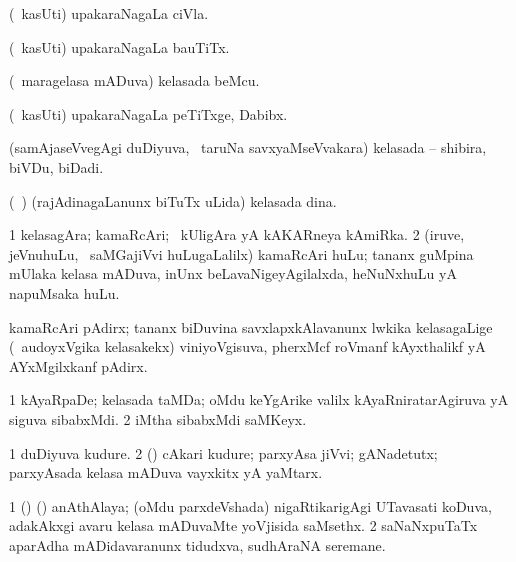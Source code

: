 \begin{center}
\bentry
{} 
\gl{\nA}
\expl{}
\bmng
(\kanmu\ kasUti) upakaraNagaLa ciVla. 
\emng
\eentry

\bentry 
{} 
\gl{\nA}
\expl{}
\bmng
(\kanmu\ kasUti) upakaraNagaLa bauTiTx. 
\emng
\eentry

\bentry
{} 
\gl{\nA}
\expl{}
\bmng
(\kanmu\ maragelasa mADuva) kelasada beMcu. 
\emng
\eentry

\bentry
{} 
\gl{\nA}
\expl{}
\bmng
(\kanmu\ kasUti) upakaraNagaLa peTiTxge, Dabibx. 
\emng
\eentry

\bentry
{} 
\gl{\nA}
\expl{}
\bmng
(samAjaseVvegAgi duDiyuva, \kanmu\ taruNa savxyaMseVvakara) kelasada -- shibira, biVDu, biDadi. 
\emng
\eentry

\bentry
{} 
\gl{\nA}
\expl{}
\bmng
(\kanmu\ \ame) (rajAdinagaLanunx biTuTx uLida) kelasada dina. 
\emng
\eentry

\bentry
{} 
\gl{\nA}
\expl{}
\bmng
\bnum
\num{1} kelasagAra; kamaRcAri; \kanmu\ kUligAra yA kAKARneya kAmiRka. 
\num{2} (iruve, jeVnuhuLu, \mo\ saMGajiVvi huLugaLalilx) kamaRcAri huLu; tananx guMpina mUlaka kelasa mADuva, inUnx beLavaNigeyAgilalxda, heNuNxhuLu yA napuMsaka huLu. 
\enum
\emng
\eentry

\bentry 
{} 
\gl{\nA}
\expl{}
\bmng
kamaRcAri pAdirx; tananx biDuvina savxlapxkAlavanunx lwkika kelasagaLige (\kanmu\ audoyxVgika kelasakekx) viniyoVgisuva, pherxMcf roVmanf kAyxthalikf yA AYxMgilxkanf pAdirx. 
\emng
\eentry

\bentry
{} 
\gl{\nA}
\expl{}
\bmng
\bnum
\num{1} kAyaRpaDe; kelasada taMDa; oMdu keYgArike \mo valilx kAyaRniratarAgiruva yA siguva sibabxMdi. 
\num{2} iMtha sibabxMdi saMKeyx. 
\enum
\emng
\eentry

\bentry
{} 
\gl{\nA}
\expl{}
\bmng
\bnum
\num{1} duDiyuva kudure. 
\num{2} (\rUpa) cAkari kudure; parxyAsa jiVvi; gANadetutx; parxyAsada kelasa mADuva vayxkitx yA yaMtarx. 
\enum
\emng
\eentry

\bentry
{} 
\gl{\nA}
\expl{}
\bmng
% 
\bnum
\num{1} (\birx) (\ca) anAthAlaya; (oMdu parxdeVshada) nigaRtikarigAgi UTavasati koDuva, adakAkxgi avaru kelasa mADuvaMte yoVjisida saMsethx. 
\num{2} saNaNxpuTaTx aparAdha mADidavaranunx tidudxva, sudhAraNA seremane. 
\enum
\emng
\eentry


\end{center}
